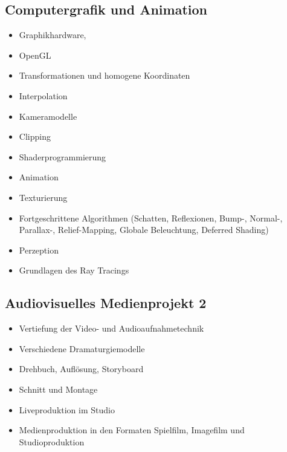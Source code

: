 \subsection*{Computergrafik und
Animation\label{/mi-2017/modulbeschreibungen-bachelor/BA_Vertiefung-Visual-Computing}}\label{computergrafik-und-animationpathlabelmi-2017modulbeschreibungen-bachelorbaux5fvertiefung-visual-computing-2}

\begin{itemize}
\tightlist
\item
  Graphikhardware,
\item
  OpenGL
\item
  Transformationen und homogene Koordinaten
\item
  Interpolation
\item
  Kameramodelle
\item
  Clipping
\item
  Shaderprogrammierung
\item
  Animation
\item
  Texturierung
\item
  Fortgeschrittene Algorithmen (Schatten, Reflexionen, Bump-, Normal-,
  Parallax-, Relief-Mapping, Globale Beleuchtung, Deferred Shading)
\item
  Perzeption
\item
  Grundlagen des Ray Tracings
\end{itemize}

\subsection*{Audiovisuelles Medienprojekt
2\label{/mi-2017/modulbeschreibungen-bachelor/BA_Vertiefung-Visual-Computing}}\label{audiovisuelles-medienprojekt-2pathlabelmi-2017modulbeschreibungen-bachelorbaux5fvertiefung-visual-computing-2}

\begin{itemize}
\tightlist
\item
  Vertiefung der Video- und Audioaufnahmetechnik
\item
  Verschiedene Dramaturgiemodelle
\item
  Drehbuch, Auflösung, Storyboard
\item
  Schnitt und Montage
\item
  Liveproduktion im Studio
\item
  Medienproduktion in den Formaten Spielfilm, Imagefilm und
  Studioproduktion
\end{itemize}

